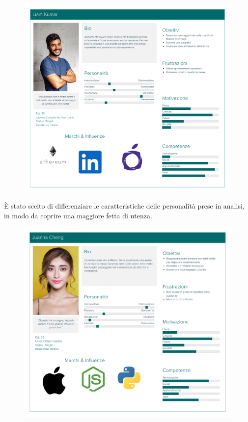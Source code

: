\documentclass{natourDoc}
\begin{document}
\begin{figure}[!htbp]
	\centering
	\includegraphics[width=\textwidth]{./personas/personas-kumar.pdf}
\end{figure}

È stato scelto di differenziare le caratteristiche delle personalità prese in analisi, in modo da coprire una maggiore fetta di utenza.
\begin{figure}[!htbp]
	\centering
	\includegraphics[width=\textwidth]{./personas/personas-cheng.pdf}
\end{figure}
\end{document}
